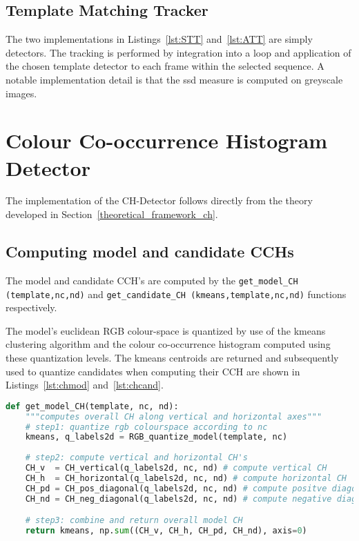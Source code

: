\subsection{Template Matching Tracker}
The two implementations in Listings~\ref{lst:STT} and~\ref{lst:ATT} are simply
detectors. The tracking is performed by integration into a loop and application
of the chosen template detector to each frame within the selected sequence.
A notable implementation detail is that the ssd measure is computed on greyscale
images.

\section{Colour Co-occurrence Histogram Detector}\label{implementation_ch}
The implementation of the CH-Detector follows directly from the theory developed
in Section~\ref{theoretical_framework_ch}.

\subsection{Computing model and candidate CCHs}
The model and candidate CCH's are computed by the \lstinline{get_model_CH (template,nc,nd)} 
and \lstinline{get_candidate_CH (kmeans,template,nc,nd)}
functions respectively.

The model's euclidean RGB colour-space is quantized by use of the kmeans
clustering algorithm and the colour co-occurrence histogram computed using these
quantization levels. The kmeans centroids are returned and subsequently used to
quantize candidates when computing their CCH are shown in
Listings~\ref{lst:chmod} and~\ref{lst:chcand}.

\begin{lstlisting}[language=Python, caption={Computing model CH}, captionpos=b, label={lst:chmod}]
def get_model_CH(template, nc, nd):
    """computes overall CH along vertical and horizontal axes"""
    # step1: quantize rgb colourspace according to nc
    kmeans, q_labels2d = RGB_quantize_model(template, nc)
    
    # step2: compute vertical and horizontal CH's
    CH_v  = CH_vertical(q_labels2d, nc, nd) # compute vertical CH
    CH_h  = CH_horizontal(q_labels2d, nc, nd) # compute horizontal CH
    CH_pd = CH_pos_diagonal(q_labels2d, nc, nd) # compute positve diagonal CH
    CH_nd = CH_neg_diagonal(q_labels2d, nc, nd) # compute negative diagonal CH

    # step3: combine and return overall model CH
    return kmeans, np.sum((CH_v, CH_h, CH_pd, CH_nd), axis=0)
\end{lstlisting}

